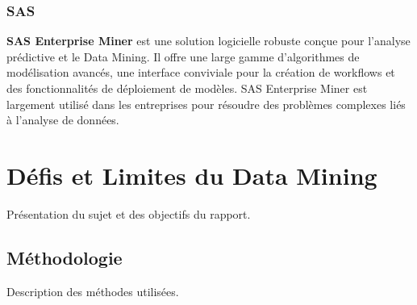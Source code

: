 \documentclass[a4paper,12pt]{report}
\begin{document}
    \subsection{SAS}
    \textbf{SAS Enterprise Miner} est une solution logicielle robuste conçue pour l’analyse prédictive et le Data Mining. Il offre une large gamme d’algorithmes de modélisation avancés, une interface conviviale pour la création de workflows et des fonctionnalités de déploiement de modèles. SAS Enterprise Miner est largement utilisé dans les entreprises pour résoudre des problèmes complexes liés à l’analyse de données.



\chapter{Défis et Limites du Data Mining}
Présentation du sujet et des objectifs du rapport.

\section{Méthodologie}
Description des méthodes utilisées.



\end{document}
